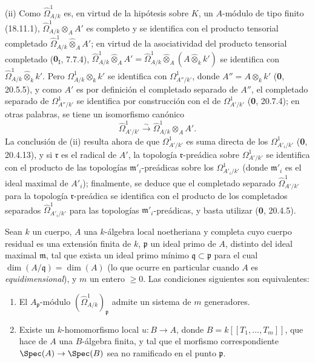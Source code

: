 (ii) Como $\hat{\Omega}^1_{A/k}$ es, en virtud de la hipótesis sobre $K$, un $A$-módulo de tipo finito (18.11.1), $\hat{\Omega}^1_{A/k}\otimes_A A'$ es completo y se identifica con el producto tensorial completado $\hat{\Omega}^1_{A/k}\widehat{\otimes}_A A'$; en virtud de la asociatividad del producto tensorial completado ($\mathbf{0}_{\mathrm I}$, 7.7.4), $\hat{\Omega}^1_{A/k}\widehat{\otimes}_A A'=\hat{\Omega}^1_{A/k}\widehat{\otimes}_A(A\widehat{\otimes}_k k')$ se identifica con $\hat{\Omega}^1_{A/k}\widehat{\otimes}_k k'$. Pero $\Omega^1_{A/k}\otimes_k k'$ se identifica con $\Omega^1_{A''/k'}$, donde $A''=A\otimes_k k'$ (\textbf 0, 20.5.5), y como $A'$ es por definición el completado separado de $A''$, el completado separado de $\Omega^1_{A''/k'}$ se identifica por construcción con el de $\Omega^1_{A'/k'}$ (\textbf 0, 20.7.4); en otras palabras, se tiene un isomorfismo canónico
\[
  \hat{\Omega}^1_{A'/k'}\xrightarrow{\sim}\hat{\Omega}^1_{A/k}\otimes_A A'.
\]
La conclusión de (ii) resulta ahora de que $\Omega^1_{A'/k'}$ es suma directa de los $\Omega^1_{A'_i/k'}$ (\textbf 0, 20.4.13), y si $\mathfrak r$ es el radical de $A'$, la topología $\mathfrak r$-preádica sobre $\Omega^1_{A'/k'}$ se identifica con el producto de las topologías $\mathfrak m'_i$-preádicas sobre los $\Omega^1_{A'_i/k'}$ (donde $\mathfrak m'_i$ es el ideal maximal de $A'_i$); finalmente, se deduce que el completado separado $\hat{\Omega}^1_{A'/k'}$ para la topología $\mathfrak r$-preádica se identifica con el producto de los completados separados $\hat{\Omega}^1_{A'_i/k'}$ para las topologías $\mathfrak m'_i$-preádicas, y basta utilizar (\textbf 0, 20.4.5).

\begin{proposition}[18.11.5]
\label{IV.18.11.5}
Sean $k$ un cuerpo, $A$ una $k$-álgebra local noetheriana y completa cuyo cuerpo residual es una extensión finita de $k$, $\mathfrak p$ un ideal primo de $A$, distinto del ideal maximal $\mathfrak m$, tal que exista un ideal primo mínimo $\mathfrak q\subset\mathfrak p$ para el cual $\dim(A/\mathfrak q)=\dim(A)$ \textup{(lo que ocurre en particular cuando $A$ es \emph{equidimensional})}, y $m$ un entero $\geq0$. Las condiciones siguientes son equivalentes:
\begin{enumerate}
  \item[\textup{a)}] El $A_{\mathfrak p}$-módulo $(\hat{\Omega}^1_{A/k})_{\mathfrak p}$ admite un sistema de $m$ generadores.
  \item[\textup{b)}] Existe un $k$-homomorfismo local $u:B\to A$, donde $B=k[[T_1,\ldots,T_m]]$, que hace de $A$ una $B$-álgebra finita, y tal que el morfismo correspondiente $\Spec(A)\to\Spec(B)$ sea no ramificado en el punto $\mathfrak p$.
\end{enumerate}
\end{proposition}

